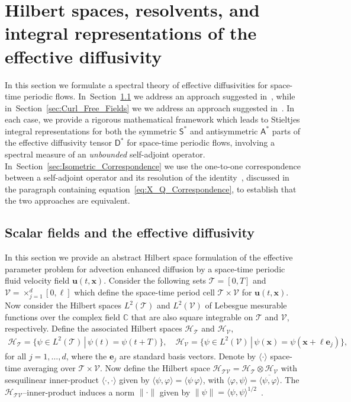 \documentclass[leqno,onefignum,onetabnum]{siamltex1213}
\newcommand{\secref}[1]{Section~\ref{#1}}
\newcommand{\Tc}{\mathcal{T}}
\newcommand{\Vc}{\mathcal{V}}
\newcommand{\Dm}{\mathsf{D}}
\newcommand{\Sm}{\mathsf{S}}
\newcommand{\Am}{\mathsf{A}}
\newcommand{\Hs}{\mathscr{H}}
\newcommand{\vecx}{\boldsymbol{x}}
\newcommand{\vecu}{\boldsymbol{u}}
\newcommand{\vece}{\boldsymbol{e}}
\begin{document}
\section{Hilbert spaces, resolvents, and integral representations of the effective diffusivity}
\label{sec:Hilbert_Resolvent_Integral_Reps} 
%
In this section we formulate a spectral theory of effective
diffusivities for space-time periodic
flows. In~\secref{sec:Scalar_Fields} we address an approach suggested
in~\cite{Pavliotis:PHD_Thesis}, while in~\secref{sec:Curl_Free_Fields}
we we address an approach suggested in~\cite{Avellaneda:PRE:3249}. In 
each case, we provide a rigorous mathematical framework which leads to
Stieltjes integral representations for both the symmetric $\Sm^*$ and
antisymmetric $\Am^*$ parts of the effective diffusivity tensor
$\Dm^*$ for space-time periodic
flows, involving a spectral measure of an \emph{unbounded}
self-adjoint operator. In~\secref{sec:Isometric_Correspondence} we use
the one-to-one correspondence between a self-adjoint operator and its
resolution of the identity~\cite{Stone:64}, discussed in the paragraph
containing equation~\eqref{eq:X_Q_Correspondence}, to establish that
the two approaches are equivalent.  



\subsection{Scalar fields and the effective diffusivity}\label{sec:Scalar_Fields}
%
In this section we provide an abstract Hilbert space formulation of
the effective parameter problem for advection enhanced diffusion by a
space-time periodic fluid velocity field $\vecu(t,\vecx)$. Consider
the following sets $\Tc=[0,T]$ and $\Vc=\times_{j=1}^d[0,\ell]$ which 
define the space-time period cell $\Tc\times\Vc$ for $\vecu(t,\vecx)$. Now
consider the Hilbert spaces $L^2(\Tc)$ and $L^2(\Vc)$ of Lebesgue mesurable
functions over the complex field $\mathbb{C}$ that are also square
integrable on $\Tc$ and $\Vc$, respectively. Define the associated
Hilbert spaces $\Hs_{\Tc}$ and $\Hs_{\Vc}$,
%
\begin{align}\label{eq:Hilbert_Spaces_scalar}
  \Hs_{\Tc}=\big\{\psi\in L^2(\Tc) \, | \, \psi(t)=\psi(t+T)\big\}, \quad
  \Hs_{\Vc}=\big\{\psi\in L^2(\Vc) \, | \, \psi(\vecx)=\psi(\vecx+\ell\vece_j)\big\},  
\end{align}
%
for all $j=1,\ldots,d$, where the $\vece_j$ are standard basis vectors. Denote by 
$\langle\cdot\rangle$ space-time averaging over $\Tc\times\Vc$. Now define the Hilbert space 
$\Hs_{\Tc\Vc}=\Hs_{\Tc}\otimes\Hs_{\Vc}$ with sesquilinear
inner-product $\langle\cdot,\cdot\rangle$ given by $\langle\psi,\varphi\rangle=\langle\psi\,\varphi\rangle$, with $\langle\varphi,\psi\rangle=\overline{\langle\psi,\varphi\rangle}$. The $\Hs_{\Tc\Vc}$--inner-product induces a norm $\|\cdot\|$ given by 
$\|\psi\|=\langle\psi,\psi\rangle^{1/2}$~\cite{Folland:99:RealAnalysis}. 
\end{document}
